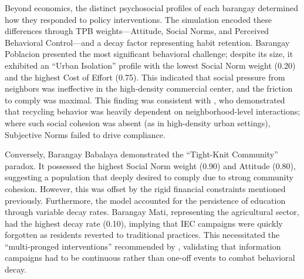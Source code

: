 Beyond economics, the distinct psychosocial profiles of each barangay determined how they responded to policy interventions. The simulation encoded these differences through TPB weights—Attitude, Social Norms, and Perceived Behavioral Control—and a decay factor representing habit retention. Barangay Poblacion presented the most significant behavioral challenge; despite its size, it exhibited an ``Urban Isolation'' profile with the lowest Social Norm weight (0.20) and the highest Cost of Effort (0.75). This indicated that social pressure from neighbors was ineffective in the high-density commercial center, and the friction to comply was maximal. This finding was consistent with \cite{Meng2018}, who demonstrated that recycling behavior was heavily dependent on neighborhood-level interactions; where such social cohesion was absent (as in high-density urban settings), Subjective Norms failed to drive compliance.

Conversely, Barangay Babalaya demonstrated the ``Tight-Knit Community'' paradox. It possessed the highest Social Norm weight (0.90) and Attitude (0.80), suggesting a population that deeply desired to comply due to strong community cohesion. However, this was offset by the rigid financial constraints mentioned previously. Furthermore, the model accounted for the persistence of education through variable decay rates. Barangay Mati, representing the agricultural sector, had the highest decay rate (0.10), implying that IEC campaigns were quickly forgotten as residents reverted to traditional practices. This necessitated the ``multi-pronged interventions'' recommended by \cite{Trushna2024}, validating that information campaigns had to be continuous rather than one-off events to combat behavioral decay.
